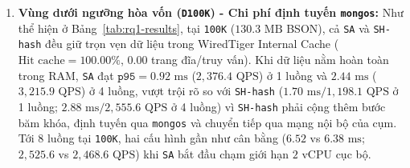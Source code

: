 \begin{enumerate}[leftmargin=0.8cm, itemsep=4pt]
  \item \textbf{Vùng dưới ngưỡng hòa vốn (\texttt{D100K}) - Chi phí định tuyến \texttt{mongos}:} Như thể hiện ở Bảng~\ref{tab:rq1-results}, tại \texttt{100K} ($130.3\text{ MB}$ BSON), cả \texttt{SA} và \texttt{SH-hash} đều giữ trọn vẹn dữ liệu trong WiredTiger Internal Cache ($\text{Hit cache} = 100.00\%$, $0.00$ trang đĩa/truy vấn). Khi dữ liệu nằm hoàn toàn trong RAM, \texttt{SA} đạt $\texttt{p95} = 0.92\text{ ms}$ ($2{,}376.4\text{ QPS}$) ở 1 luồng và $2.44\text{ ms}$ ($3{,}215.9\text{ QPS}$) ở 4 luồng, vượt trội rõ so với \texttt{SH-hash} ($1.70\text{ ms} / 1{,}198.1\text{ QPS}$ ở 1 luồng; $2.88\text{ ms} / 2{,}555.6\text{ QPS}$ ở 4 luồng) vì \texttt{SH-hash} phải cộng thêm bước băm khóa, định tuyến qua \texttt{mongos} và chuyển tiếp qua mạng nội bộ của cụm. Tới 8 luồng tại \texttt{100K}, hai cấu hình gần như cân bằng ($6.52$ vs $6.38\text{ ms}$; $2{,}525.6$ vs $2{,}468.6\text{ QPS}$) khi \texttt{SA} bắt đầu chạm giới hạn $2\text{ vCPU}$ cục bộ.


\end{enumerate}
